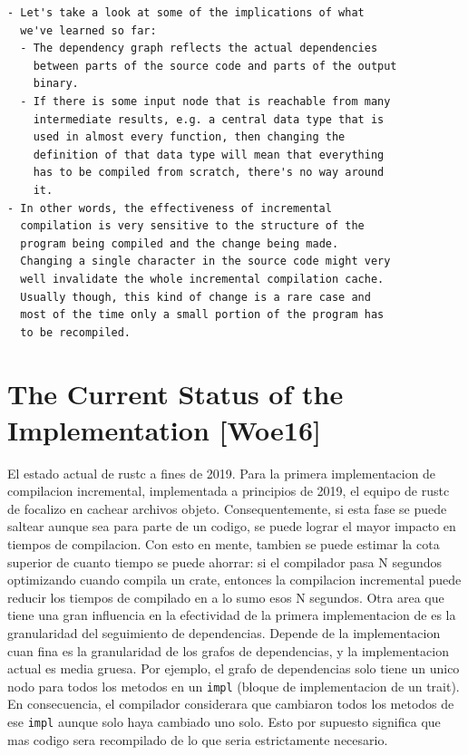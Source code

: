 \documentclass[12pt, a4paper]{report}
\begin{document}
\begin{verbatim}
- Let's take a look at some of the implications of what
  we've learned so far:
  - The dependency graph reflects the actual dependencies
    between parts of the source code and parts of the output
    binary.
  - If there is some input node that is reachable from many
    intermediate results, e.g. a central data type that is
    used in almost every function, then changing the
    definition of that data type will mean that everything
    has to be compiled from scratch, there's no way around
    it.
- In other words, the effectiveness of incremental
  compilation is very sensitive to the structure of the
  program being compiled and the change being made.
  Changing a single character in the source code might very
  well invalidate the whole incremental compilation cache.
  Usually though, this kind of change is a rare case and
  most of the time only a small portion of the program has
  to be recompiled.
\end{verbatim}
\cite{rust_blog_incremental_compilation}

\section*{The Current Status of the Implementation [Woe16]}

El estado actual de rustc a fines de 2019.
Para la primera implementacion de compilacion incremental, implementada a principios de 2019, el equipo de rustc de focalizo en cachear archivos objeto.
Consequentemente, si esta fase se puede saltear aunque sea para parte de un codigo, se puede lograr el mayor impacto en tiempos de compilacion.
Con esto en mente, tambien se puede estimar la cota superior de cuanto tiempo se puede ahorrar: si el compilador pasa N segundos optimizando cuando compila un crate, entonces la compilacion incremental puede reducir los tiempos de compilado en a lo sumo esos N segundos.
Otra area que tiene una gran influencia en la efectividad de la primera implementacion de es la granularidad del seguimiento de dependencias.
Depende de la implementacion cuan fina es la granularidad de los grafos de dependencias, y la implementacion actual es media gruesa.
Por ejemplo, el grafo de dependencias solo tiene un unico nodo para todos los metodos en un \texttt{impl} (bloque de implementacion de un trait).
En consecuencia, el compilador considerara que cambiaron todos los metodos de ese \texttt{impl} aunque solo haya cambiado uno solo.
Esto por supuesto significa que mas codigo sera recompilado de lo que seria estrictamente necesario.
\cite{rust_blog_incremental_compilation}
\end{document}
